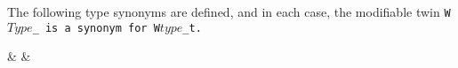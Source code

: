 The following type synonyms are defined, and in each case, the
modifiable twin \tt{W}$Type$\_ is a synonym for \tt{W}$type$\tt{_t}.

 &  & \\
\elbat
